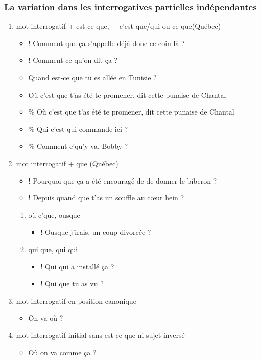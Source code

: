 \documentclass[UTF8]{report}
\begin{document}
\subsubsection{La variation dans les interrogatives partielles indépendantes}
\begin{enumerate}
    \item mot interrogatif + est-ce que, + c’est que/qui ou ce que(Québec)
    \begin{itemize}
        \item ! Comment que ça s’appelle déjà donc ce coin-là ?
        \item ! Comment ce qu’on dit ça ?
        \item Quand est-ce que tu es allée en Tunisie ?
        \item Où c’est que t’as été te promener, dit cette punaise de Chantal 
        \item \% Où c’est que t’as été te promener, dit cette punaise de Chantal
        \item \% Qui c’est qui commande ici ?
        \item \% Comment c’qu’y va, Bobby ?
    \end{itemize}
    \item mot interrogatif + que (Québec)
    \begin{itemize}
        \item ! Pourquoi que ça a été encouragé de de donner le biberon ?
        \item ! Depuis quand que t’as un souffle au cœur hein ?
    \end{itemize}
    \begin{enumerate}
        \item où c’que, ousque
        \begin{itemize}
            \item ! Ousque j’irais, un coup divorcée ?
        \end{itemize}
        \item qui que, qui qui
        \begin{itemize}
            \item ! Qui qui a installé ça ?
            \item ! Qui que tu as vu ?
        \end{itemize}
    \end{enumerate}
    \item mot interrogatif en position canonique
    \begin{itemize}
        \item On va où ?
    \end{itemize}
    \item mot interrogatif initial sans est-ce que ni sujet inversé
    \begin{itemize}
        \item Où on va comme ça ?
    \end{itemize}
\end{enumerate}
\end{document}
